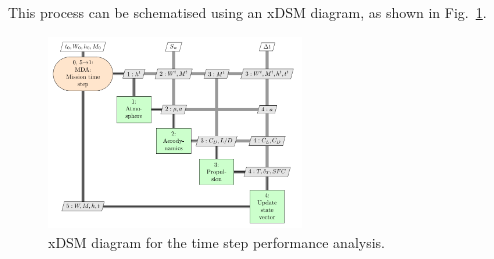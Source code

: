 This process can be schematised using an xDSM diagram, as shown in Fig.~\ref{fig:fast_mission_segment}.
\begin{figure}[!h]
	\centering
	\includegraphics[keepaspectratio, width=0.6\textwidth]{images/chap2/FAST_mission_segment}
	\caption{xDSM diagram for the time step performance analysis.}
	\label{fig:fast_mission_segment}
\end{figure}


